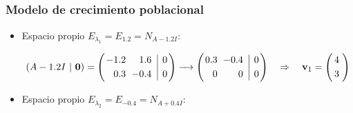 
\subsection{}

\begin{frame}\frametitle{Modelo de crecimiento poblacional}
		
	\begin{itemize}
		\item Espacio propio $E_{\lambda_1}=E_{1.2}=N_{A-1.2I}$:
		
		\[				
			(A-1.2I \ | \ \mathbf{0})
			=
			\left(
			\begin{array}{@{\hspace{0.2\tabcolsep}}r@{\hspace{\tabcolsep}}r@{\hspace{\tabcolsep}}|r@{\hspace{0.2\tabcolsep}}}
			-1.2 & 1.6 & 0  \\[1mm]
			 0.3 & -0.4 & 0
			\end{array}
			\right) 
			\xrightarrow[]{\phantom{xx} }		
			\left(
			\begin{array}{@{\hspace{0.2\tabcolsep}}r@{\hspace{\tabcolsep}}r@{\hspace{\tabcolsep}}|r@{\hspace{0.2\tabcolsep}}}
			0.3 & -0.4 & 0  \\[1mm]
			  0 &    0 & 0
			\end{array}
			\right) 
			\quad \Rightarrow \quad 
			\mathbf{v}_1 = 
			\left(
			\begin{array}{@{\hspace{0.3\tabcolsep}}c@{\hspace{0.5\tabcolsep}}}
				4   \\[1mm]
				3 
			\end{array}
			\right) 
		\]
		
		\vspace{6mm}
		\item  Espacio propio $E_{\lambda_2}=E_{-0.4}=N_{A+0.4I}$:
		

\end{itemize}
\end{frame}

